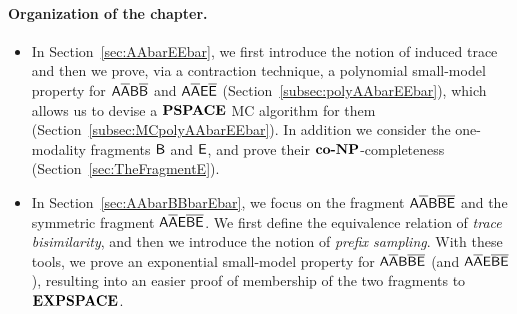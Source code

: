 \paragraph*{Organization of the chapter.} 
\begin{itemize}
	\item In Section~\ref{sec:AAbarEEbar}, we first introduce the notion of induced trace and then we
    prove, via a contraction technique, a polynomial small-model property for $\mathsf{A\overline{A}B\overline{B}}$ and $\mathsf{A\overline{A}E\overline{E}}$ (Section~\ref{subsec:polyAAbarEEbar}), which allows us to devise a $\textbf{PSPACE}$ MC algorithm for them (Section~\ref{subsec:MCpolyAAbarEEbar}). In addition we consider the one-modality fragments $\mathsf{B}$ and $\mathsf{E}$, and prove their $\textbf{co-}\textbf{NP}$-completeness (Section~\ref{sec:TheFragmentE}).
	\item In Section~\ref{sec:AAbarBBbarEbar}, we focus on the fragment $\mathsf{A\overline{A}B\overline{B}\overline{E}}$ and the symmetric fragment $\mathsf{A\overline{A}E\overline{B}\overline{E}}$. We first define the equivalence relation of \emph{trace bisimilarity}, and then we introduce the    
    notion of \emph{prefix sampling}. With these tools, we prove an exponential small-model property for $\mathsf{A\overline{A}B\overline{B}\overline{E}}$ (and $\mathsf{A\overline{A}E\overline{B}\overline{E}}$), resulting into an easier proof of membership of the two fragments to $\textbf{EXPSPACE}$.
\end{itemize}
